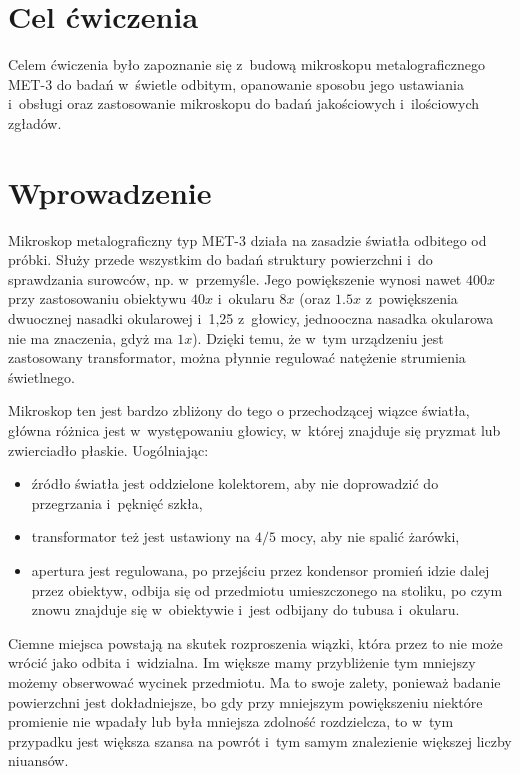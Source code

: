 

\newcommand{\labdate}{28 listopada 2020}
\newcommand{\temat}{Mikroskop MET-3}


    



\section{Cel ćwiczenia}

Celem ćwiczenia było zapoznanie się z~budową mikroskopu metalograficznego MET-3 do badań w~świetle odbitym, opanowanie sposobu jego ustawiania i~obsługi oraz zastosowanie mikroskopu do badań jakościowych i~ilościowych zgładów.

\section{Wprowadzenie}

Mikroskop metalograficzny typ MET-3 działa na zasadzie światła odbitego od próbki. Służy przede wszystkim do badań struktury powierzchni i~do sprawdzania surowców, np. w~przemyśle. Jego powiększenie wynosi nawet $400x$ przy zastosowaniu obiektywu $40x$ i~okularu $8x$ (oraz $1.5x$ z~powiększenia dwuocznej nasadki okularowej i~1,25 z~głowicy, jednooczna nasadka okularowa nie ma znaczenia, gdyż ma $1x$). Dzięki temu, że w~tym urządzeniu jest zastosowany transformator, można płynnie regulować natężenie strumienia świetlnego. 

Mikroskop ten jest bardzo zbliżony do tego o przechodzącej wiązce światła, główna różnica jest w~występowaniu głowicy, w~której znajduje się pryzmat lub zwierciadło płaskie. 
\newline
Uogólniając: 
\begin{itemize}
    \item źródło światła jest oddzielone kolektorem, aby nie doprowadzić do przegrzania i~pęknięć szkła,
    \item transformator też jest ustawiony na $4/5$ mocy, aby nie spalić żarówki,
    \item apertura jest regulowana, po przejściu przez kondensor promień idzie dalej przez obiektyw, odbija się od przedmiotu umieszczonego na stoliku, po czym znowu znajduje się w~obiektywie i~jest odbijany do tubusa i~okularu.
\end{itemize}

Ciemne miejsca powstają na skutek rozproszenia wiązki, która przez to nie może wrócić jako odbita i~widzialna. Im większe mamy przybliżenie tym mniejszy możemy obserwować wycinek przedmiotu. Ma to swoje zalety, ponieważ badanie powierzchni jest dokładniejsze, bo gdy przy mniejszym powiększeniu niektóre promienie nie wpadały lub była mniejsza zdolność rozdzielcza, to w~tym przypadku jest większa szansa na powrót i~tym samym znalezienie większej liczby niuansów. 

